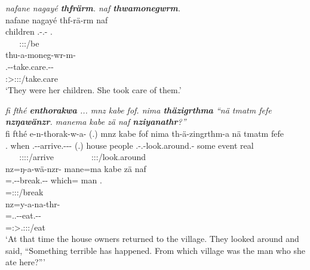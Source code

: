 \begin{exe}
	\ex \textit{nafane nagayé \textbf{thfrärm}. naf \textbf{thwamonegwrm}.}\\
	\glll nafane nagayé thf-rä-rm naf\\
	\Tsg{\Poss} children \Stnsg.\Betatwo-\Cop.\Ndu-\Dur{} \Tsg.{\Erg}\\
	~ ~  {\footnotesize \Stpl:\Sbj:\Pst:\Dur/be} ~\\
	\sn
	\glll thu-a-moneg-wr-m-\Zero{}\\
	\Stnsg.\Betaone-\Vc-take.care.\Ext-\Ndu-\Dur\\
	{\footnotesize \Stsg:\Sbj>\Stpl:\Obj:\Pst:\Dur/take.care}\\
	\trans `They were her children. She took care of them.' 
	\label{ex006}
\end{exe}
\begin{exe}
	\ex \emph{fi fthé \textbf{enthorakwa} ... mnz kabe fof. nima \textbf{thäzigrthma} ``nä tmatm fefe \textbf{nzŋawänzr}. manema kabe zä naf \textbf{nziyanathr}?''}\\
	\glll fi fthé e-n-thorak-w-a-\Zero{} (.) mnz kabe fof nima th-ä-zingrthm-a nä tmatm fefe\\
	\Third.{\Abs} when \Stnsg.\Alph-\Venit-arrive.\Ext-\Ndu-\Pst-\Stsg{} (.) house people {\Emph} {\Quot} \Stnsg.\Gam-\Vc.\Ndu-look.around.\Rs-\Pst{} some event real\\
	~ ~ {\footnotesize \Stpl:\Sbj:\Pst:\Ipfv:\Venit/arrive} ~ ~ ~ ~ ~ {\footnotesize \Stpl:\Sbj:\Pst:\Pfv/look.around} ~ ~ ~\\
	\sn
	\glll nz=ŋ-a-wä-nzr-\Zero{} mane=ma kabe zä naf\\
	\Immpst{}=\M.\Alph-\Vc-break.\Ext-\Ndu-\Stsg{} which={\Char} man {\Prox} \Tsg.{\Erg}\\
	{\footnotesize \Immpst=\Stsg:\Sbj:\Nonpast:\Ipfv/break} ~ ~ ~ ~\\
	\sn
	\glll nz=y-a-na-thr-\Zero{}\\
	\Immpst{}=\Tsg.\Masc.\Alph-\Vc-eat.\Ext-\Ndu-\Stsg{}\\
	 {\footnotesize \Immpst=\Stsg:\Sbj>\Tsg.\Masc:\Obj:\Nonpast:\Ipfv/eat}\\
	\trans `At that time the house owners returned to the village. They looked around and said, ``Something terrible has happened. From which village was the man who she ate here?''' 
	\label{ex007}
\end{exe}

